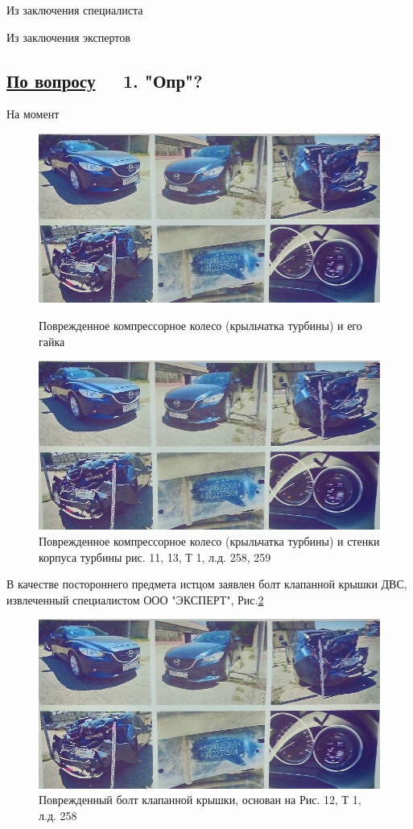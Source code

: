 Из заключения специалиста  

\vspace{\baselineskip}
%
%
Из заключения экспертов  

\vspace{\baselineskip}
\renewcommand\baselinestretch{0.86}\small\normalsize 
\subsection{\underline{По  вопросу}\, \, \,	\textbf{\small{1. "Опр"?}}}
\renewcommand\baselinestretch{1.2}\small\normalsize
На момент 

\begin{figure}[H]\centering
	\parbox[t]{0.49\textwidth}
	{\centering
		\includegraphics[width=.49\textwidth]{images/k1}
		\caption{\footnotesize {Поврежденное компрессорное колесо (крыльчатка турбины) и его  гайка  }}
		\label{ris:images/k1}}
	\hfil \hfil
	\parbox[t]{0.49\textwidth}
	{\centering
		\includegraphics[width=.49\textwidth]{images/k2}
		\caption{\footnotesize {Поврежденное компрессорное колесо (крыльчатка турбины) и стенки корпуса турбины
				рис. 11, 13, Т 1, л.д. 258, 259}}
		\label{ris:images/k2}}
\end{figure}

В качестве постороннего предмета истцом заявлен болт клапанной крышки ДВС, извлеченный специалистом ООО "ЭКСПЕРТ",  Рис.\ref{ris:images/b1}
\vspace{\baselineskip}  %

\begin{figure}[!h]
	\centering
	\includegraphics[width=0.95\linewidth]{images/b1}
	\caption{{\footnotesize {Поврежденный болт клапанной крышки, основан на Рис. 12, Т 1, л.д. 258}}}
	\label{ris:images/b1}
\end{figure}

